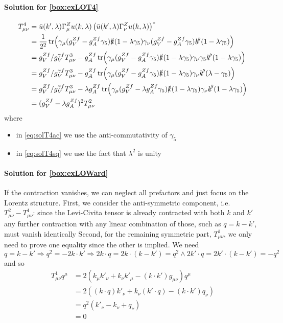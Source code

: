 \paragraph{Solution for \cref{box:exLOT4}}
\begin{align}
    T^4_{\mu\nu} &= \bar u(k',\lambda)\Gamma^Z_\mu u(k,\lambda) \left(\bar u(k',\lambda)\Gamma^{Z}_\nu u(k,\lambda)\right)^*\\
        &=\frac 1 {2^2} \tr(\gamma_\mu(g_V^{Z f}- g_A^{Z f}\gamma_5) \slashed{k}(1-\lambda \gamma_5)\gamma_\nu (g_V^{Z f}- g_A^{Z f}\gamma_5) \slashed{k'} (1-\lambda \gamma_5))\\
        &= g_V^{Z f}/g_V^{\gamma f} T^3_{\mu\nu} - g_A^{Z f}\tr(\gamma_\mu(g_V^{Z f}- g_A^{Z f}\gamma_5) \slashed{k}(1-\lambda \gamma_5)\gamma_\nu \gamma_5 \slashed{k'} (1-\lambda \gamma_5))\\
        &= g_V^{Z f}/g_V^{\gamma f} T^3_{\mu\nu} - g_A^{Z f}\tr(\gamma_\mu(g_V^{Z f}- g_A^{Z f}\gamma_5) \slashed{k}(1-\lambda \gamma_5)\gamma_\nu \slashed{k'} (\lambda - \gamma_5))\label{eq:solT4ac}\\
        &= g_V^{Z f}/g_V^{\gamma f} T^3_{\mu\nu} - \lambda g_A^{Z f}\tr(\gamma_\mu(g_V^{Z f}- \lambda g_A^{Z f}\gamma_5) \slashed{k}(1-\lambda \gamma_5)\gamma_\nu \slashed{k'} (1 - \lambda\gamma_5))\label{eq:solT4sq}\\
        &= (g_V^{Z f} - \lambda g_A^{Z f})^2 T^2_{\mu\nu}
\end{align}
where
\begin{itemize}
    \item in \cref{eq:solT4ac} we use the anti-commutativity of $\gamma_5$
    \item in \cref{eq:solT4sq} we use the fact that $\lambda^2$ is unity
\end{itemize}

\paragraph{Solution for \cref{box:exLOWard}}
If the contraction vanishes, we can neglect all prefactors and just focus on the Lorentz structure.
First, we consider the anti-symmetric component, i.e.\ $T^2_{\mu\nu} - T^1_{\mu\nu}$: since the Levi-Civita tensor is already contracted with both $k$ and $k'$ any further contraction with any linear combination of those, such as $q = k - k'$, must vanish identically
Second, for the remaining symmetric part, $T^1_{\mu\nu}$, we only need to prove one equality since the other is implied.
We need
\begin{equation}
    q = k - k' \Rightarrow q^2 = -2k\cdot k' \Rightarrow 2k\cdot q = 2k \cdot (k-k') = q^2 \land 2k'\cdot q = 2k'\cdot(k-k') = -q^2 \label{eq:solqprod}
\end{equation}
and so
\begin{align}
    T^1_{\mu\nu}q^\mu &= 2\left(k_\mu k'_\nu + k_\nu k'_\mu - (k \cdot k') g_{\mu\nu}\right) q^\mu\\
    &= 2\left((k\cdot q) k'_\nu + k_\nu (k' \cdot q)  - (k \cdot k') q_{\nu}\right)\\
    &= q^2 \left(k'_\nu - k_\nu + q_\nu \right)\\
    &= 0
\end{align}

